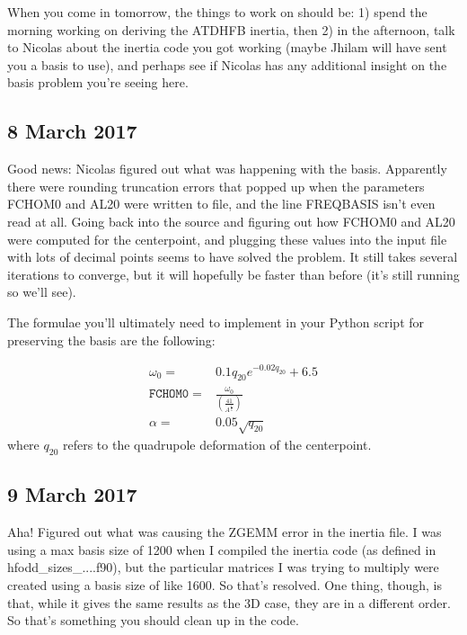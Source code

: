 \documentclass[]{report}
\begin{document}
When you come in tomorrow, the things to work on should be: 1) spend the morning working on deriving the ATDHFB inertia, then 2) in the afternoon, talk to Nicolas about the inertia code you got working (maybe Jhilam will have sent you a basis to use), and perhaps see if Nicolas has any additional insight on the basis problem you're seeing here.

\subsection*{8 March 2017}
Good news: Nicolas figured out what was happening with the basis. Apparently there were rounding truncation errors that popped up when the parameters FCHOM0 and AL20 were written to file, and the line FREQBASIS isn't even read at all. Going back into the source and figuring out how FCHOM0 and AL20 were computed for the centerpoint, and plugging these values into the input file with lots of decimal points seems to have solved the problem. It still takes several iterations to converge, but it will hopefully be faster than before (it's still running so we'll see).

The formulae you'll ultimately need to implement in your Python script for preserving the basis are the following:

\begin{eqnarray}
\omega_0        =& 0.1q_{20}e^{-0.02q_{20}}+6.5 \\
\mathtt{FCHOM0} =& \frac{\omega_0}{\left(\frac{41}{A^\frac{1}{3}}\right)} \\
\alpha          =& 0.05\sqrt{q_{20}}
\end{eqnarray}
\noindent where $q_{20}$ refers to the quadrupole deformation of the centerpoint.

\subsection*{9 March 2017}
Aha! Figured out what was causing the ZGEMM error in the inertia file. I was using a max basis size of 1200 when I compiled the inertia code (as defined in hfodd\_sizes\_....f90), but the particular matrices I was trying to multiply were created using a basis size of like 1600. So that's resolved. One thing, though, is that, while it gives the same results as the 3D case, they are in a different order. So that's something you should clean up in the code. 
\end{document}
